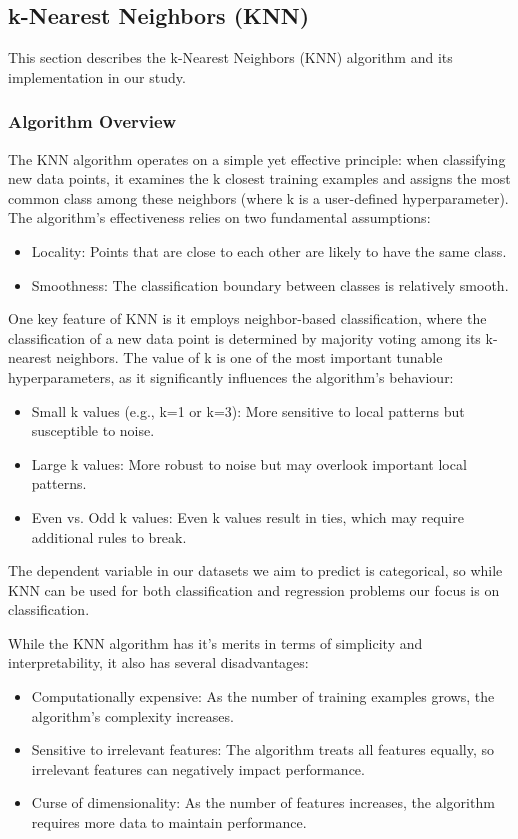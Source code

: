 \subsection{k-Nearest Neighbors (KNN)}
\label{subsec:methods-knn}

This section describes the k-Nearest Neighbors (KNN) algorithm and its implementation in our study.

\subsubsection{Algorithm Overview}

The KNN algorithm operates on a simple yet effective principle: when classifying new data points, 
it examines the k closest training examples and assigns the most common class among these neighbors (where k is a user-defined hyperparameter). 
The algorithm's effectiveness relies on two fundamental assumptions:
\begin{itemize}
    \item Locality: Points that are close to each other are likely to have the same class.
    \item Smoothness: The classification boundary between classes is relatively smooth.
\end{itemize}

One key feature of KNN is it employs neighbor-based classification, where the classification of a new data point 
is determined by majority voting among its k-nearest neighbors. 
The value of k is one of the most important tunable hyperparameters, as it significantly influences the algorithm's behaviour:
\begin{itemize}
    \item Small k values (e.g., k=1 or k=3): More sensitive to local patterns but susceptible to noise.
    \item Large k values: More robust to noise but may overlook important local patterns.
    \item Even vs. Odd k values: Even k values result in ties, which may require additional rules to break.
\end{itemize}

The dependent variable in our datasets we aim to predict is categorical, so while KNN can be used for both classification and regression problems 
our focus is on classification.

While the KNN algorithm has it's merits in terms of simplicity and interpretability, it also has several disadvantages:
\begin{itemize}
    \item Computationally expensive: As the number of training examples grows, the algorithm's complexity increases\cite{laviale2023}.
    \item Sensitive to irrelevant features: The algorithm treats all features equally, so irrelevant features can negatively impact performance.
    \item Curse of dimensionality: As the number of features increases, the algorithm requires more data to maintain performance.
\end{itemize}

